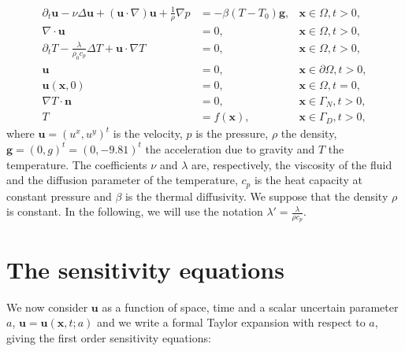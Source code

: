\begin{subequations}
\begin{align}
\partial_t \mathbf{u} - \nu \Delta \mathbf{u} + (\mathbf{u} \cdot \nabla) \mathbf{u} + \displaystyle \frac{1}{\rho} \nabla p &= -\beta(T-T_0)\mathbf{g}, & \mathbf{x} \in \Omega, t > 0, \label{eq:state_moment}\\
\nabla \cdot \mathbf{u} &= 0, & \mathbf{x} \in \Omega, t>0, \label{eq:state_masse}\\
\partial_t T - \displaystyle \frac{\lambda}{\rho_0c_p} \Delta T + \mathbf{u} \cdot \nabla T &= 0,  & \mathbf{x} \in \Omega, t>0, \label{eq:state_energie}\\
\mathbf{u}  & = 0, & \mathbf{x} \in \partial \Omega, t > 0,\label{eq:state_Cl_D}\\
\mathbf{u}(\mathbf{x}, 0) &= 0,  & \mathbf{x} \in \Omega, t = 0, \label{eq:state_CI}\\
\nabla T \cdot \mathbf{n} &= 0,  & \mathbf{x} \in \Gamma_N, t>0,\label{eq:state_Cl_N}\\
T &= f(\mathbf{x}), & \mathbf{x} \in \Gamma_D, t>0\label{eq:state_Cl_T_D},
\end{align}
\label{eq_NS_T}
\end{subequations}
where $\mathbf{u} = (u^x, u^y)^t$ is the velocity, $p$ is the pressure, $\rho$ the density, $\mathbf{g} = (0, g)^t = (0, -9.81)^t$ the acceleration due to gravity and $T$ the temperature. The coefficients $\nu$ and $\lambda$ are, respectively, the viscosity of the fluid and the diffusion parameter of the temperature, $c_p$ is the heat capacity at constant pressure and $\beta$ is the thermal diffusivity. We suppose that the density $\rho$ is constant. In the following, we will use the notation $\lambda' = \frac{\lambda}{\rho c_p}$. 

\section{The sensitivity equations}
We now consider $\mathbf{u}$ as a function of space, time and a scalar uncertain parameter $a$, $\mathbf{u} = \mathbf{u}(\mathbf{x},t;a)$ and we write a formal Taylor expansion with respect to $a$, giving the first order sensitivity equations:

